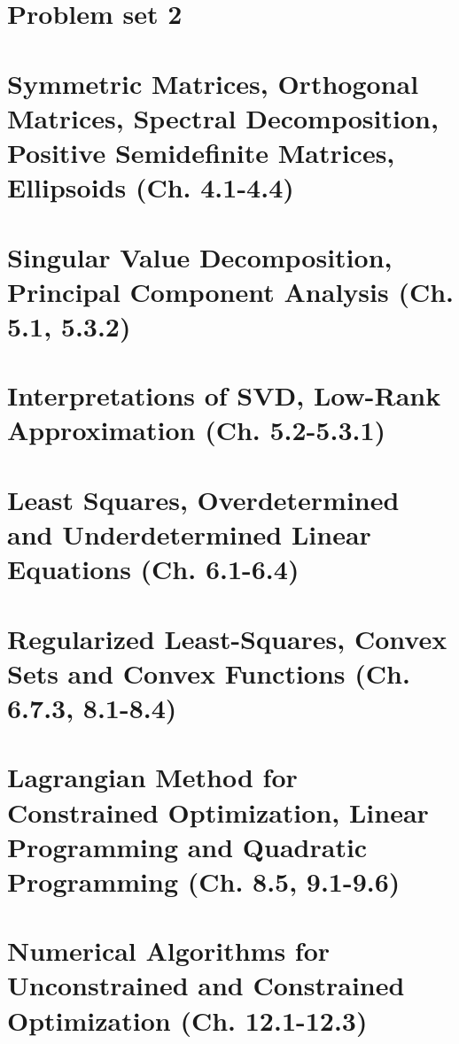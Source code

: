 \documentclass{article}
\begin{document}
\section{Problem set 2}

\newpage

\section{Symmetric Matrices, Orthogonal Matrices, Spectral Decomposition, Positive Semidefinite Matrices, Ellipsoids (Ch. 4.1-4.4)}

\newpage

\section{Singular Value Decomposition, Principal Component Analysis (Ch. 5.1, 5.3.2)}

\newpage

\section{Interpretations of SVD, Low-Rank Approximation (Ch. 5.2-5.3.1)}

\newpage

\section{Least Squares, Overdetermined and Underdetermined Linear Equations (Ch. 6.1-6.4)}

\newpage

\section{Regularized Least-Squares, Convex Sets and Convex Functions (Ch. 6.7.3, 8.1-8.4)}

\newpage

\section{Lagrangian Method for Constrained Optimization, Linear Programming and Quadratic Programming (Ch. 8.5, 9.1-9.6)}

\newpage

\section{Numerical Algorithms for Unconstrained and Constrained Optimization (Ch. 12.1-12.3)}

\end{document}
